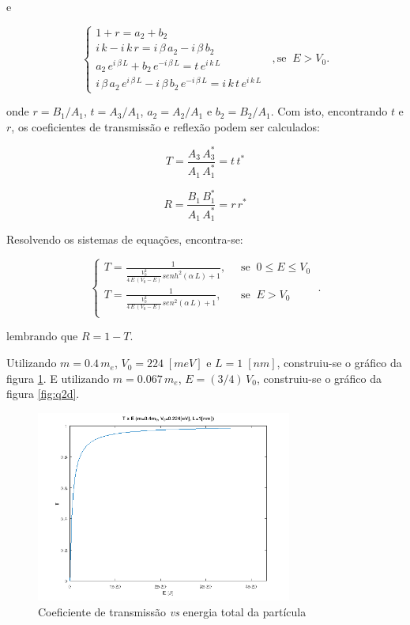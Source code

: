 \noindent e

\begin{equation}
	\begin{cases}
		1 + r = a_2 + b_2                                             \\
		i\,k - i\,k\,r = i\,\beta\,a_2 - i\,\beta\,b_2                \\
		a_2\,e^{i\,\beta\,L} + b_2\,e^{-i\,\beta\,L} = t\,e^{i\,k\,L} \\
		i\,\beta\,a_2\,e^{i\,\beta\,L} - i\,\beta\,b_2\,e^{-i\,\beta\,L} =
		i\,k\,t\,e^{i\,k\,L}
	\end{cases}\;\;, \mbox{se}\;\;E > V_0.
\end{equation}

\noindent onde $r=B_1/A_1$, $t=A_3/A_1$, $a_2=A_2/A_1$ e $b_2=B_2/A_1$. Com
isto, encontrando $t$ e $r$, os coeficientes de transmissão e reflexão podem
ser calculados:

\begin{equation}
	T=\frac{A_3\,A_3^*}{A_1\,A_1^*} = t\,t^*
\end{equation}

\begin{equation}
	R=\frac{B_1\,B_1^*}{A_1\,A_1^*} = r\,r^*
\end{equation}

Resolvendo os sistemas de equações, encontra-se:

\begin{equation}
	\begin{cases}
		T=\frac{1}{\frac{V_0^2}{4\,E\,(V_0-E)}senh^2(\alpha\,L)+1},
		 & \;\;\mbox{se}\;\;0 \le E \le V_0 \\
		T=\frac{1}{\frac{V_0^2}{4\,E\,(V_0-E)}sen^2(\alpha\,L)+1},
		 & \;\;\mbox{se}\;\;E > V_0         \\
	\end{cases}\;.
\end{equation}

\noindent lembrando que $R=1-T$.

Utilizando $m=0.4\,m_e$, $V_0=224\;[meV]$ e $L=1\;[nm]$, construiu-se o gráfico
da figura \ref{fig:q2c}. E utilizando $m=0.067\,m_e$, $E=(3/4)\,V_0$,
construiu-se o gráfico da figura \ref{fig:q2d}.

\begin{figure}[H] \centering
	\includegraphics[width=0.75\textwidth]{../images/q2c.png}
	\caption{ Coeficiente de transmissão \textit{vs} energia total da partícula }
	\label{fig:q2c}
\end{figure}

